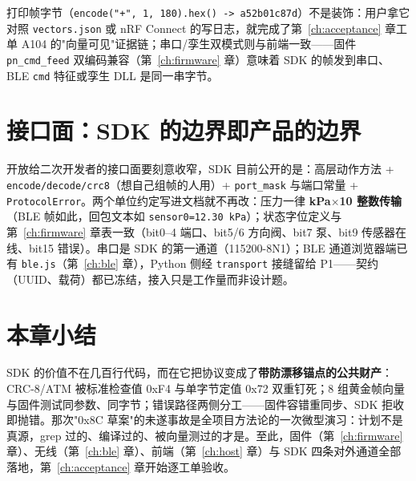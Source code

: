 打印帧字节（\texttt{encode("+", 1, 180).hex() -> a52b01c87d}）不是装饰：用户拿它对照 \texttt{vectors.json} 或 nRF Connect 的写日志，就完成了第~\ref{ch:acceptance} 章工单 A104 的"向量可见"证据链；串口/孪生双模式则与前端一致——固件 \texttt{pn\_cmd\_feed} 双编码兼容（第~\ref{ch:firmware} 章）意味着 SDK 的帧发到串口、BLE \texttt{cmd} 特征或孪生 DLL 是同一串字节。

\section{接口面：SDK 的边界即产品的边界}
\label{sec:sdk-surface}

开放给二次开发者的接口面要刻意收窄，SDK 目前公开的是：高层动作方法 + \texttt{encode/decode/crc8}（想自己组帧的人用）+ \texttt{port\_mask} 与端口常量 + \texttt{ProtocolError}。两个单位约定写进文档就不再改：压力一律 \textbf{kPa$\times$10 整数传输}（BLE 帧如此，回包文本如 \texttt{sensor0=12.30 kPa}）；状态字位定义与第~\ref{ch:firmware} 章表一致（bit0--4 端口、bit5/6 方向阀、bit7 泵、bit9 传感器在线、bit15 错误）。串口是 SDK 的第一通道（115200-8N1）；BLE 通道浏览器端已有 \texttt{ble.js}（第~\ref{ch:ble} 章），Python 侧经 \texttt{transport} 接缝留给 P1——契约（UUID、载荷）都已冻结，接入只是工作量而非设计题。

\section*{本章小结}
SDK 的价值不在几百行代码，而在它把协议变成了\textbf{带防漂移锚点的公共财产}：CRC-8/ATM 被标准检查值 0xF4 与单字节定值 0x72 双重钉死；8 组黄金帧向量与固件测试同参数、同字节；错误路径两侧分工——固件容错重同步、SDK 拒收即抛错。那次"0x8C 草案"的未遂事故是全项目方法论的一次微型演习：计划不是真源，grep 过的、编译过的、被向量测过的才是。至此，固件（第~\ref{ch:firmware} 章）、无线（第~\ref{ch:ble} 章）、前端（第~\ref{ch:host} 章）与 SDK 四条对外通道全部落地，第~\ref{ch:acceptance} 章开始逐工单验收。
